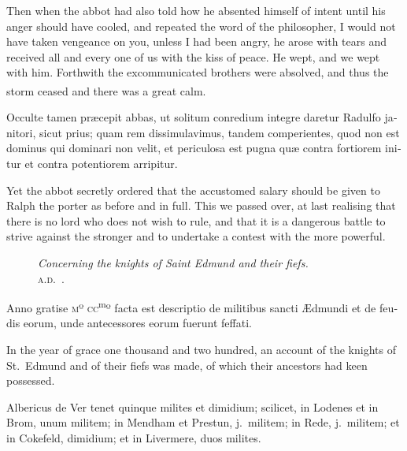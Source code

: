\documentclass[10pt]{book}
\newcounter{engnote}
\newcommand{\engnotenum}{\textsuperscript{\arabic{engnote}\stepcounter{engnote}}}
\newcommand{\blockhead}[4][]{
\begin{figure}
\centering
\vspace{#4}
\parbox{2.75cm}{\begin{center}\footnotesize \color{BrickRed} \emph{#2}\\ #1 \end{center}}
\end{figure}
}
\begin{document}
\begin{paracol}{2}
\switchcolumn

Then when the abbot had also told how he absented himself of intent until his anger should have cooled, and repeated the word of the philosopher, I would not have taken vengeance on you, unless I had been angry, he arose with tears and received all and every one of us with the kiss of peace. He wept, and we wept with him. Forthwith the excommunicated brothers were absolved, and thus the storm ceased and there was a great calm.\engnotenum{}

\switchcolumn*

\begin{otherlanguage}{latin}
Occulte tamen pr\ae{}cepit abbas, ut solitum conredium integre daretur Radulfo janitori, sicut prius; quam rem dissimulavimus, tandem comperientes, quod non est dominus qui dominari non velit, et periculosa est pugna qu\ae{} contra fortiorem initur et contra potentiorem arripitur.
\end{otherlanguage}

\switchcolumn

Yet the abbot secretly ordered that the accustomed salary should be given to Ralph the porter as before and in full. This we passed over, at last realising that there is no lord who does not wish to rule, and that it is a dangerous battle to strive against the stronger and to undertake a contest with the more powerful.

\switchcolumn*

\begin{otherlanguage}{latin}
\blockhead[\textsc{a.d}.\ .]{Concerning the knights of Saint Edmund and their fiefs.}{4}{-.65cm}
Anno gratise \textsc{m}º \textsc{cc}\textsuperscript{m}º facta est descriptio de militibus sancti \AE{}dmundi et de feudis eorum, unde antecessores eorum fuerunt feffati.

\end{otherlanguage}

\switchcolumn

In the year of grace one thousand and two hundred, an account of the knights of St.\ Edmund and of their fiefs was made, of which their ancestors had keen possessed.

\switchcolumn*

\begin{otherlanguage}{latin}
Albericus de Ver tenet quinque milites et dimidium; scilicet, in Lodenes et in Brom, unum militem; in Mendham et Prestun, j.\ militem; in Rede, j.\ militem; et in Cokefeld, dimidium; et in Livermere, duos milites.
\end{otherlanguage}


\end{paracol}
\end{document}
